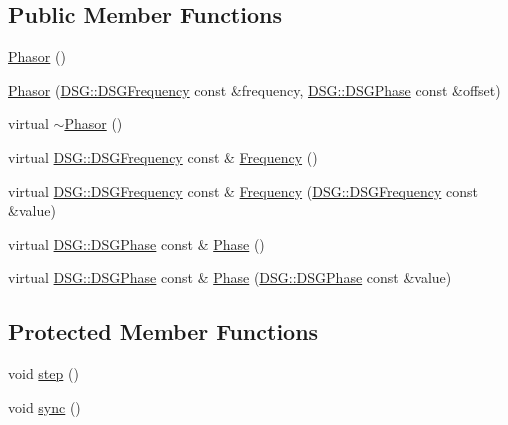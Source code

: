 \subsection*{Public Member Functions}
\begin{DoxyCompactItemize}
\item 
\hyperlink{class_d_s_g_1_1_phasor_adc6b13ffdb208286a689a5aeab0fb342}{Phasor} ()
\item 
\hyperlink{class_d_s_g_1_1_phasor_a34511b38200e71b6d3bb95872da91dbd}{Phasor} (\hyperlink{namespace_d_s_g_a4315a061386fa1014fda09b15d3a6973}{D\+S\+G\+::\+D\+S\+G\+Frequency} const \&frequency, \hyperlink{namespace_d_s_g_a44431ce1eb0a7300efdd207bc879e52c}{D\+S\+G\+::\+D\+S\+G\+Phase} const \&offset)
\item 
virtual \hyperlink{class_d_s_g_1_1_phasor_a37b72afd6bd58cebf10cc937e73ef094}{$\sim$\+Phasor} ()
\item 
virtual \hyperlink{namespace_d_s_g_a4315a061386fa1014fda09b15d3a6973}{D\+S\+G\+::\+D\+S\+G\+Frequency} const \& \hyperlink{class_d_s_g_1_1_phasor_a6bdec1d2722e2fa5c7173ac5f7adf682}{Frequency} ()
\item 
virtual \hyperlink{namespace_d_s_g_a4315a061386fa1014fda09b15d3a6973}{D\+S\+G\+::\+D\+S\+G\+Frequency} const \& \hyperlink{class_d_s_g_1_1_phasor_a8162456ae44291008159acd89bfa7b1b}{Frequency} (\hyperlink{namespace_d_s_g_a4315a061386fa1014fda09b15d3a6973}{D\+S\+G\+::\+D\+S\+G\+Frequency} const \&value)
\item 
virtual \hyperlink{namespace_d_s_g_a44431ce1eb0a7300efdd207bc879e52c}{D\+S\+G\+::\+D\+S\+G\+Phase} const \& \hyperlink{class_d_s_g_1_1_phasor_af8eb0ff79a11ae02186505ff6ac085dd}{Phase} ()
\item 
virtual \hyperlink{namespace_d_s_g_a44431ce1eb0a7300efdd207bc879e52c}{D\+S\+G\+::\+D\+S\+G\+Phase} const \& \hyperlink{class_d_s_g_1_1_phasor_a0b25bc87161096ae08a8e8d1f5eb3913}{Phase} (\hyperlink{namespace_d_s_g_a44431ce1eb0a7300efdd207bc879e52c}{D\+S\+G\+::\+D\+S\+G\+Phase} const \&value)
\end{DoxyCompactItemize}
\subsection*{Protected Member Functions}
\begin{DoxyCompactItemize}
\item 
void \hyperlink{class_d_s_g_1_1_phasor_a6a088b29e506fb5e99d73f4f0160c583}{step} ()
\item 
void \hyperlink{class_d_s_g_1_1_phasor_a3e9022f8264d4b2ffc485ef725d331e8}{sync} ()
\end{DoxyCompactItemize}
